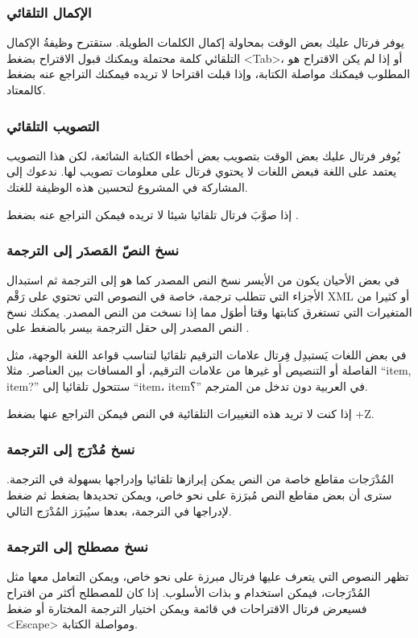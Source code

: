 \subsubsection{الإكمال التلقائي}
يوفر فرتال عليك بعض الوقت بمحاولة إكمال الكلمات الطويلة. ستقترح وظيفةُ
الإكمال التلقائي كلمة محتملة ويمكنك قبول الاقتراح بضغط <Tab>، أو إذا لم
يكن الاقتراح هو المطلوب فيمكنك مواصلة الكتابة، وإذا قبلت اقتراحا لا
تريده فيمكنك التراجع عنه بضغط  كالمعتاد.

\subsubsection{التصويب التلقائي}
يُوفر فرتال عليك بعض الوقت بتصويب بعض أخطاء الكتابة الشائعة، لكن هذا
التصويب يعتمد على اللغة فبعض اللغات لا يحتوي فرتال على معلومات تصويب
لها. ندعوك إلى المشاركة في المشروع لتحسين هذه الوظيفة للغتك.

إذا صوَّبَ فرتال تلقائيا شيئا لا تريده فيمكن التراجع عنه بضغط .

\subsubsection[ref:36503815]{نسخ النصّ المَصدَر إلى الترجمة}
في بعض الأحيان يكون من الأيسر نسخ
النص المصدر كما هو إلى الترجمة ثم استبدال الأجزاء التي تتطلب ترجمة،
خاصة في النصوص التي تحتوي على رَقْم XML أو كثيرا من المتغيرات التي
تستغرق كتابتها وقتا أطوَل مما إذا نسخت من النص المصدر. يمكنك نسخ النص
المصدر إلى حقل الترجمة بيسر بالضغط على .

في بعض اللغات يَستبدِل فِرتال علامات الترقيم تلقائيا لتناسب قواعد اللغة
الوجهة، مثل الفاصلة أو التنصيص أو غيرها من علامات الترقيم، أو المسافات
بين العناصر. مثلا ‪“item, item?”‬ ستتحول تلقائيا إلى ‪“item، item؟”‬ في
العربية دون تدخل من المترجم.

إذا كنت لا تريد هذه التغييرات التلقائية في النص فيمكن التراجع عنها بضغط
+Z.

\subsubsection[ref:32596109]{نسخ مُدْرَج إلى الترجمة}
المُدْرَجات مقاطع خاصة من النص
يمكن إبرازها تلقائيا وإدراجها بسهولة في الترجمة. سترى أن بعض مقاطع النص
مُبرَزة على نحو خاص، ويمكن تحديدها بضغط  ثم ضغط 
لإدراجها في الترجمة، بعدها سيُبرَز المُدْرَج التالي.

\subsubsection{نسخ مصطلح إلى الترجمة}
تظهر النصوص التي يتعرف عليها فرتال مبرزة على نحو خاص، ويمكن التعامل معها
مثل المُدْرَجات، فيمكن استخدام  و  بذات الأسلوب.
إذا كان للمصطلح أكثر من اقتراح فسيعرض فرتال الاقتراحات في قائمة ويمكن
اختيار الترجمة المختارة أو ضغط <Escape> ومواصلة الكتابة.

